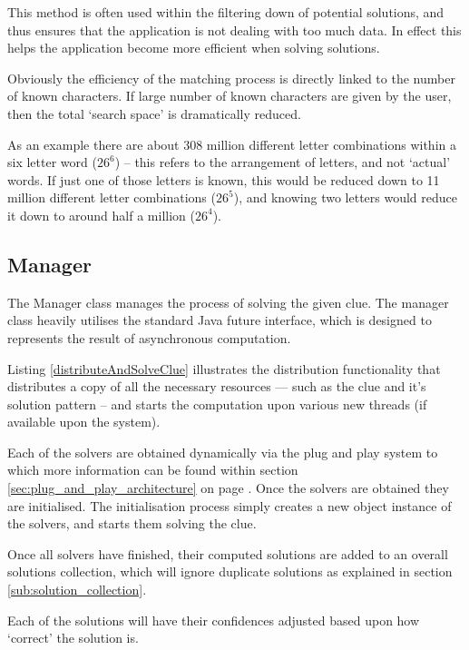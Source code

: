 This method is often used within the filtering down of potential solutions, and
thus ensures that the application is not dealing with too much data. In effect
this helps the application become more efficient when solving solutions. 

Obviously the efficiency of the matching process is directly linked to the 
number of known characters. If large number of known characters are given by the
user, then the total `search space' is dramatically reduced.

As an example there are about 308 million different letter combinations within a
six letter word ($26^6$) -- this refers to the arrangement of letters, and not 
`actual' words. If just one of those letters is known, this would be reduced 
down to 11 million different letter combinations ($26^5$), and knowing two 
letters would reduce it down to around half a million ($26^4$).


\subsection{Manager}
\label{sub:manager}

The Manager class manages the process of solving the given clue. The manager 
class heavily utilises the standard Java future interface, which is designed to
represents the result of asynchronous computation.

Listing \ref{distributeAndSolveClue} illustrates the distribution functionality 
that distributes a copy of all the necessary resources --- such as the clue 
and it's solution pattern -- and starts the computation upon various new 
threads (if available upon the system).

Each of the solvers are obtained dynamically via the plug and play system to 
which more information can be found within section 
\ref{sec:plug_and_play_architecture} on page \pageref{sec:plug_and_play_architecture}.
Once the solvers are obtained they are initialised. The initialisation process
simply creates a new object instance of the solvers, and starts them solving the
clue.

Once all solvers have finished, their computed solutions are added to an overall
solutions collection, which will ignore duplicate solutions as explained in 
section \ref{sub:solution_collection}.

Each of the solutions will have their confidences adjusted based upon how 
`correct' the solution is.

